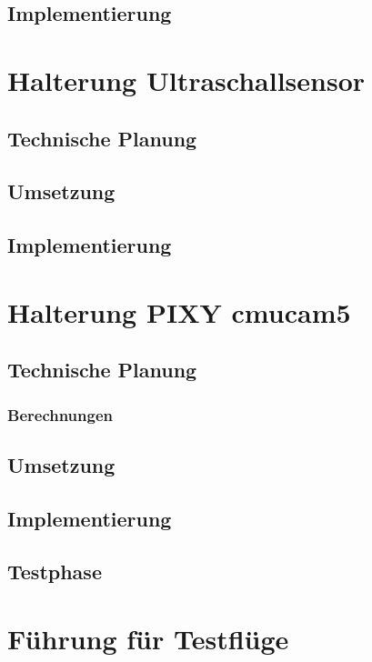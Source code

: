 	\subsection{Implementierung}

\section{Halterung Ultraschallsensor}

	\subsection{Technische Planung}

	\subsection{Umsetzung}

	\subsection{Implementierung}

\section{Halterung PIXY cmucam5}

	\subsection{Technische Planung}

		\subsubsection{Berechnungen}

	\subsection{Umsetzung}

	\subsection{Implementierung}

	\subsection{Testphase}

\section{Führung für Testflüge}

